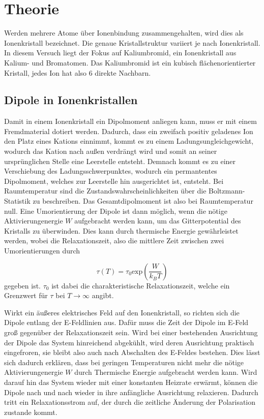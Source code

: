 \section{Theorie}
\label{sec:Theorie}

Werden mehrere Atome über Ionenbindung zusammengehalten, wird dies als Ionenkristall bezeichnet. Die genaue Kristallstruktur variiert je nach Ionenkristall.
In diesem Versuch liegt der Fokus auf Kaliumbromid, ein Ionenkristall aus Kalium- und Bromatomen. Das Kaliumbromid ist ein kubisch flächenorientierter Kristall,
jedes Ion hat also 6 direkte Nachbarn. 

\subsection{Dipole in Ionenkristallen}

Damit in einem Ionenkristall ein Dipolmoment anliegen kann, muss er mit einem Fremdmaterial dotiert werden. Dadurch, dass ein zweifach positiv geladenes Ion den Platz eines 
Kations einnimmt, kommt es zu einem Ladungsungleichgewicht, wodurch das Kation nach außen verdrängt wird und somit an seiner ursprünglichen Stelle eine Leerstelle entsteht.
Demnach kommt es zu einer Verschiebung des Ladungsschwerpunktes, wodurch ein permantentes Dipolmoment, welches zur Leerstelle hin ausgerichtet ist, entsteht. 
Bei Raumtemperatur sind die Zustandswahrscheinlichkeiten über die Boltzmann-Statistik zu beschreiben. Das Gesamtdipolmoment ist also bei Raumtemperatur null. 
Eine Umorientierung der Dipole ist dann möglich, wenn die nötige Aktivierungenergie $W$ aufgebracht werden kann, um das Gitterpotential des Kristalls zu überwinden. 
Dies kann durch thermische Energie gewährleistet werden, wobei die Relaxationszeit, also die mittlere Zeit zwischen zwei Umorientierungen durch 

\begin{equation}
    \tau(T) = \tau_0 \text{exp} \left( \frac{W}{k_B T}\right)
\end{equation}
gegeben ist. $\tau_0 $ ist dabei die charakteristische Relaxationszeit, welche ein Grenzwert für $\tau$ bei $T \to \infty$ angibt.

Wirkt ein äußeres elektrisches Feld auf den Ionenkristall, so richten sich die Dipole entlang der E-Feldlinien aus. Dafür muss die Zeit der Dipole im E-Feld 
groß gegenüber der Relaxationszeit sein. Wird bei einer bestehenden Ausrichtung der Dipole das System hinreichend abgekühlt, wird deren Ausrichtung praktisch eingefroren, sie bleibt 
also auch nach Abschalten des E-Feldes bestehen. Dies lässt sich dadurch erklären, dass bei geringen Temperaturen nicht mehr die nötige Aktivierungenergie $W$ durch Thermische Energie 
aufgebracht werden kann. Wird darauf hin das System wieder mit einer konstanten Heizrate erwärmt, können die Dipole nach und nach wieder in ihre anfängliche Ausrichtung relaxieren. 
Dadurch tritt ein Relaxationsstrom auf, der durch die zeitliche Änderung der Polarisation zustande kommt.

